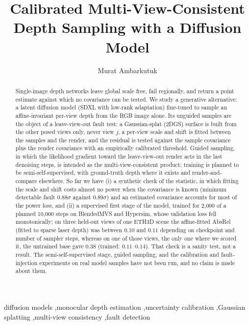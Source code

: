 \documentclass[preprint,12pt]{elsarticle}
\begin{document}
\begin{frontmatter}

\title{Calibrated Multi-View-Consistent Depth Sampling with a Diffusion Model}

\author{Murat Ambarkutuk}

\begin{abstract}
Single-image depth networks leave global scale free, fail regionally, and return a point estimate against which no covariance can be tested.
We study a generative alternative: a latent diffusion model (SDXL with low-rank adaptation) fine-tuned to sample an affine-invariant per-view depth from the RGB image alone.
Its unguided samples are the object of a leave-view-out fault test: a Gaussian-splat (2DGS) surface is built from the other posed views only, never view $j$,
a per-view scale and shift is fitted between the samples and the render, and the residual is tested against the sample covariance plus the render covariance with an empirically calibrated threshold.
Guided sampling, in which the likelihood gradient toward the leave-view-out render acts in the last denoising steps, is intended as the multi-view-consistent product; training is planned to be semi-self-supervised, with ground-truth depth where it exists and render-and-compare elsewhere.
So far we have (i) a synthetic check of the statistic, in which fitting the scale and shift costs almost no power when the covariance is known (minimum detectable fault $0.88\sigma$ against $0.89\sigma$) and an estimated covariance accounts for most of the power loss,
and (ii) a supervised first stage of the model, trained for 2{,}000 of a planned 10{,}000 steps on BlendedMVS and Hypersim, whose validation loss fell monotonically; on three held-out views of one ETH3D scene the affine-fitted AbsRel (fitted to sparse laser depth) was between $0.10$ and $0.11$ depending on checkpoint and number of sampler steps, whereas on one of those views, the only one where we scored it, the untrained base gave $0.38$ (trained: $0.11$--$0.14$).
That check is a sanity test, not a result.
The semi-self-supervised stage, guided sampling, and the calibration and fault-injection experiments on real model samples have not been run, and no claim is made about them.
\end{abstract}

\begin{keyword}
diffusion models \sep monocular depth estimation \sep uncertainty calibration \sep Gaussian splatting \sep multi-view consistency \sep fault detection
\end{keyword}

\end{frontmatter}
\end{document}
